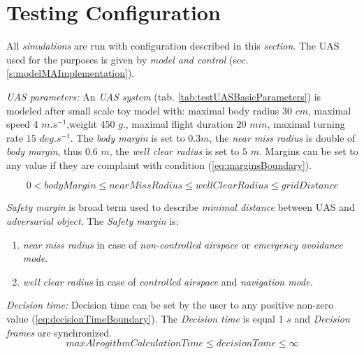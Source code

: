 \cleardoublepage
\section{Testing Configuration}\label{sec:testingConfiguration}

    \noindent All \emph{simulations} are run with configuration described in this \emph{section}. The UAS used for the purposes is given by \emph{model and control} (sec. \ref{s:modelMAImplementation}). 
    
    \emph{UAS parameters:} An \emph{UAS system} (tab. \ref{tab:testUASBasicParameters}) is modeled after small scale toy model with: maximal body radius $30$ $cm$, maximal speed $4$ $m.s^{-1}$,weight $450$ $g$., maximal flight duration $20$ $min$, maximal turning rate $15$ $deg.s^{-1}$. The \emph{body margin} is set to $0.3 m$, the \emph{near miss radius} is double of \emph{body margin}, thus $0.6$ $m$, the \emph{well clear radius} is set to $5$ $m$. Margins can be set to any value if they are complaint with condition (\ref{eq:marginsBoundary}).
    
    \begin{equation}\label{eq:marginsBoundary}
        0 < bodyMargin \le nearMissRadius \le wellClearRadius \le gridDistance
    \end{equation}   
    
    \begin{note}
        \emph{Safety margin} is broad term used to describe \emph{minimal distance} between UAS and \emph{adversarial object}. The \emph{Safety margin} is:
        \begin{enumerate}
            \item \emph{near miss radius} in case of \emph{non-controlled airspace} or \emph{emergency avoidance mode}.
            \item \emph{well clear radius} in case of \emph{controlled airspace} and \emph{navigation mode}.
        \end{enumerate}
    \end{note}
    
    \emph{Decision time:} Decision time can be set by the user to any positive non-zero value (\ref{eq:decisionTimeBoundary}). The \emph{Decision time} is equal $1$ $s$ and \emph{Decision frames} are synchronized.
    \begin{equation}\label{eq:decisionTimeBoundary}
        maxAlrogithmCalculationTime \le decisionTome \le \infty
    \end{equation}
    
